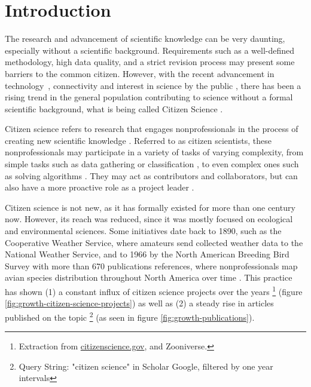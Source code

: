 \chapter*[Introduction]{Introduction}
\label{chap:introduction}

The research and advancement of scientific knowledge can be very daunting, especially without a scientific background. Requirements such as a well-defined methodology, high data quality, and a strict revision process may present some barriers to the common citizen. However, with the recent advancement in technology~\cite{newman2012future}, connectivity \cite{newman2012future} and interest in science by the public \cite{silvertown2009new}, there has been a rising trend in the general population contributing to science without a formal scientific background, what is being called Citizen Science \cite{mckinley2017citizen}.

Citizen science refers to research that engages nonprofessionals in the process of creating new scientific knowledge \cite{bonney2014next}. Referred to as citizen scientists, these nonprofessionals may participate in a variety of tasks of varying complexity, from simple tasks such as data gathering or classification \cite{barker2013pascal}, to even complex ones such as solving algorithms \cite{cooper2010predicting}. They may act as contributors and collaborators, but can also have a more proactive role as a project leader \cite{robinson2018ten}.

Citizen science is not new, as it has formally existed for more than one century now. However, its reach was reduced, since it was mostly focused on ecological and environmental sciences. Some initiatives date back to 1890, such as the Cooperative Weather Service, where amateurs send collected weather data to the National Weather Service, and to 1966 by the North American Breeding Bird Survey with more than 670 publications references, where nonprofessionals map avian species distribution throughout North America over time \cite{kosmala2016assessing}. This practice has shown (1) a constant influx of citizen science projects over the years \footnote{Extraction from \url{citizenscience.gov}, and Zooniverse.} (figure \ref{fig:growth-citizen-science-projects}) as well as (2) a steady rise in articles published on the topic \footnote{Query String: "citizen science" in Scholar Google, filtered by one year intervals} (as seen in figure \ref{fig:growth-publications}).

\publicationdata

